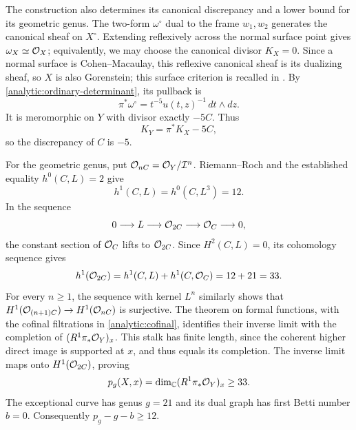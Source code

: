 \begin{remark}\label{analytic:invariants}
The construction also determines its canonical discrepancy and a
lower bound for its geometric genus.  The two-form $\omega^\circ$
dual to the frame $w_1,w_2$ generates the canonical sheaf on
$X^\circ$.  Extending reflexively across the normal surface point
gives $\omega_X\simeq\mathcal O_X$; equivalently, we may choose the
canonical divisor $K_X=0$.  Since a normal surface is Cohen--Macaulay,
this reflexive canonical sheaf is its dualizing sheaf, so $X$ is
also Gorenstein; this surface criterion is recalled in
\cite[\S2.4, Definition~2.18 and the following paragraph]{FlennerZaidenberg2001}.
By
\eqref{analytic:ordinary-determinant}, its pullback is
\[
 \pi^*\omega^\circ=t^{-5}u(t,z)^{-1}\,dt\wedge dz.
\]
It is meromorphic on $Y$ with divisor exactly $-5C$.  Thus
\[
 K_Y=\pi^*K_X-5C,
\]
so the discrepancy of $C$ is $-5$.

For the geometric genus, put
$\mathcal O_{nC}=\mathcal O_Y/\mathcal I^n$.  Riemann--Roch and the established
equality $h^0(C,L)=2$ give
\[
 h^1(C,L)=h^0(C,L^3)=12.
\]
In the sequence
\[
 0\longrightarrow L\longrightarrow\mathcal O_{2C}
 \longrightarrow\mathcal O_C\longrightarrow0,
\]
the constant section of $\mathcal O_C$ lifts to $\mathcal O_{2C}$.  Since
$H^2(C,L)=0$, its cohomology sequence gives
\[
 h^1(\mathcal O_{2C})=h^1(C,L)+h^1(C,\mathcal O_C)=12+21=33.
\]
For every $n\geq1$, the sequence with kernel $L^n$ similarly shows
that $H^1(\mathcal O_{(n+1)C})\to H^1(\mathcal O_{nC})$ is surjective.
The theorem on formal functions, with the cofinal filtrations in
\eqref{analytic:cofinal}, identifies their inverse limit with the
completion of $(R^1\pi_*\mathcal O_Y)_x$.  This stalk has finite length,
since the coherent higher direct image is supported at $x$, and
thus equals its completion.  The inverse limit maps onto
$H^1(\mathcal O_{2C})$, proving
\[
 p_g(X,x)=\dim_\mathbb C (R^1\pi_*\mathcal O_Y)_x\geq33.
\]
The exceptional curve has genus $g=21$ and its dual graph has first
Betti number $b=0$.  Consequently $p_g-g-b\geq12$.
\end{remark}
